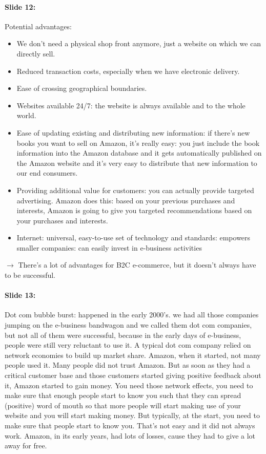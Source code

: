 \documentclass[10pt,a4paper]{report}
\begin{document}
\paragraph{Slide 12:}Potential advantages: 
\begin{itemize}
\item We don't need a physical shop front anymore, just a website on which we can directly sell. 
\item Reduced transaction costs, especially when we have electronic delivery.
\item Ease of crossing geographical boundaries.
\item Websites available 24/7: the website is always available and to the whole world.
\item Ease of updating existing and distributing new information: if there's new books you want to sell on Amazon, it's really easy: you just include the book information into the Amazon database and it gets automatically published on the Amazon website and it's very easy to distribute that new information to our end consumers.
\item Providing additional value for customers: you can actually provide targeted advertising. Amazon does this: based on your previous purchases and interests, Amazon is going to give you targeted recommendations based on your purchases and interests.
\item Internet: universal, easy-to-use set of technology and standards: empowers smaller companies: can easily invest in e-business activities
\end{itemize}
$\rightarrow$ There's a lot of advantages for B2C e-commerce, but it doesn't always have to be successful.

\paragraph{Slide 13:}Dot com bubble burst: happened in the early 2000's. we had all those companies jumping on the e-business bandwagon and we called them dot com companies, but not all of them were successful, because in the early days of e-business, people were still very reluctant to use it. A typical dot com company relied on network economies to build up market share. Amazon, when it started, not many people used it. Many people did not trust Amazon. But as soon as they had a critical customer base and those customers started giving positive feedback about it,  Amazon started to gain money. You need those network effects, you need to make sure that enough people start to know you such that they can spread (positive) word of mouth so that more people will start making use of your website and you will start making money.
But typically, at the start, you need to make sure that people start to know you. That's not easy and it did not always work. Amazon, in its early years, had lots of losses, cause they had to give a lot away for free.
\end{document}
